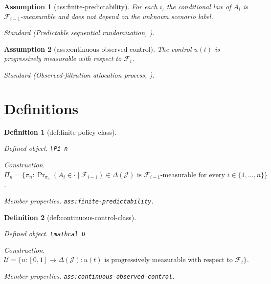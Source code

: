 \documentclass{article}
\newtheorem{assumption}{Assumption}
\newtheorem{definition}{Definition}
\begin{document}
\begin{assumption}[ass:finite-predictability]\label{ass:finite-predictability}
For each \(i\), the conditional law of \(A_i\) is \(\mathcal F_{i-1}\)-measurable and does not depend on the unknown scenario label.
\par\smallskip\noindent\emph{Standard} (Predictable sequential randomization, \cite{wagerxu2021diffusion}).
\end{assumption}

\begin{assumption}[ass:continuous-observed-control]\label{ass:continuous-observed-control}
The control \(u(t)\) is progressively measurable with respect to \(\mathcal F_t\).
\par\smallskip\noindent\emph{Standard} (Observed-filtration allocation process, \cite{adusumilli2026representations}).
\end{assumption}

\section{Definitions}

\begin{definition}[def:finite-policy-class]\label{def:finite-policy-class}
\par\smallskip\noindent\emph{Defined object.} \texttt{\textbackslash{}\allowbreak{}Pi\_\allowbreak{}n}
\par\smallskip\noindent\emph{Construction.} \(\Pi_n=\{\pi_n:\Pr_{\pi_n}(A_i\in\cdot\mid\mathcal F_{i-1})\in\Delta(\mathcal J)\text{ is }\mathcal F_{i-1}\text{-measurable for every }i\in\{1,\ldots,n\}\}\).
\par\smallskip\noindent\emph{Member properties.} \texttt{ass:\allowbreak{}finite-\allowbreak{}predictability}.
\end{definition}

\begin{definition}[def:continuous-control-class]\label{def:continuous-control-class}
\par\smallskip\noindent\emph{Defined object.} \texttt{\textbackslash{}\allowbreak{}mathcal U}
\par\smallskip\noindent\emph{Construction.} \(\mathcal U=\{u:[0,1]\to\Delta(\mathcal J):u(t)\text{ is progressively measurable with respect to }\mathcal F_t\}\).
\par\smallskip\noindent\emph{Member properties.} \texttt{ass:\allowbreak{}continuous-\allowbreak{}observed-\allowbreak{}control}.
\end{definition}
\end{document}
